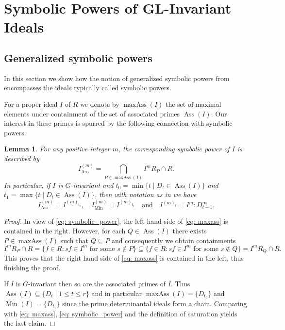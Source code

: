 \documentclass[11pt, reqno]{amsart}
\numberwithin{equation}{section}
\newtheorem{lemma}[theorem]{Lemma}
\theoremstyle{definition}
\DeclareMathOperator{\Ass}{Ass}
\DeclareMathOperator{\Min}{Min}
\DeclareMathOperator{\maxass}{maxAss}
\begin{document}
\section{Symbolic Powers of GL-Invariant Ideals}\label{s: symbolic}

\subsection{Generalized symbolic powers}

In this section we show how the notion of generalized symbolic powers from   encompasses the ideals typically called symbolic powers.

For a proper ideal $I$ of $R$ we denote by $\maxass(I)$ the set of maximal elements under containment of the set of associated primes $\Ass(I)$. Our interest in these primes is spurred by the following connection with  symbolic powers.

\begin{lemma}\label{lem: symbolic_powers_maxass}
For any positive integer $m$, the corresponding symbolic power of $I$ is described by
\begin{equation}\label{eq: maxass}
 I_{\Ass}^{(m)}=\bigcap_{P\in \maxass(I)} I^mR_P\cap R.
 \end{equation}
In particular, if $I$ is $G$-invariant and $t_0=\min\{t\mid D_t\in \Ass(I)\}$ and $t_1=\max\{t \mid D_t\in \Ass(I)\}$, then with notation as in  we have
\[
 I_{\Ass}^{(m)}= I^{(m)_{t_0}}, \quad   I_{\Min}^{(m)}= I^{(m)_{t_1}} \quad \text{and} \quad I^{(m)_t}=I^m:D_{t-1}^{\infty}.
 \]
\end{lemma}
\begin{proof}
In view of \eqref{eq: symbolic_power}, the left-hand side of \eqref{eq: maxass} is contained in the right. However, for each $Q\in \Ass(I)$ there exists $P\in\maxass(I)$ such that $Q\subseteq P$ and consequently we obtain containments
 \[
 I^mR_P\cap R =\{f\in R : sf\in I^m \text{ for some } s\not \in P\} \subseteq \{f\in R : sf\in I^m \text{ for some } s\not \in Q\} =I^mR_Q\cap R.
 \]
 This proves that the right hand side of \eqref{eq: maxass} is contained in the left, thus finishing the proof.

 If $I$ is $G$-invariant then so are the associated primes of $I$. Thus $\Ass(I)\subseteq \{D_t\mid 1\leq t\leq r\}$ and in particular $\maxass(I)=\{D_{t_0}\} $ and  $\Min(I)=\{D_{t_1}\}$ since the prime determinantal ideals form a chain. Comparing  with \eqref{eq: maxass}, \eqref{eq: symbolic_power} and the definition of saturation yields the last claim.
\end{proof}
\end{document}
